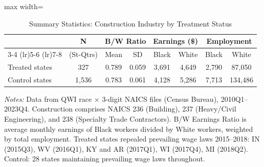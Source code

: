 \begin{table}[H]
\centering
\caption{Summary Statistics: Construction Industry by Treatment Status}
\label{tab:summary}
\begin{threeparttable}
\begin{adjustbox}{max width=\textwidth}
\begin{tabular}{lccccccc}
\toprule
 & N & \multicolumn{2}{c}{B/W Ratio} & \multicolumn{2}{c}{Earnings (\$)} & \multicolumn{2}{c}{Employment} \\
\cmidrule(lr){3-4} \cmidrule(lr){5-6} \cmidrule(lr){7-8}
 & (St-Qtrs) & Mean & SD & Black & White & Black & White \\
\midrule
Treated states & 327 & 0.789 & 0.059 & 3,691 & 4,649 & 2,790 & 87,050 \\
\midrule
Control states & 1,536 & 0.783 & 0.061 & 4,128 & 5,286 & 7,713 & 134,486 \\
\bottomrule
\end{tabular}
\end{adjustbox}
\begin{tablenotes}[flushleft]
\small
\item \textit{Notes:} Data from QWI race $\times$ 3-digit NAICS files (Census Bureau), 2010Q1--2023Q4. Construction comprises NAICS 236 (Building), 237 (Heavy/Civil Engineering), and 238 (Specialty Trade Contractors). B/W Earnings Ratio is average monthly earnings of Black workers divided by White workers, weighted by total employment. Treated states repealed prevailing wage laws 2015--2018: IN (2015Q3), WV (2016Q1), KY and AR (2017Q1), WI (2017Q4), MI (2018Q2). Control: 28 states maintaining prevailing wage laws throughout.
\end{tablenotes}
\end{threeparttable}
\end{table}
